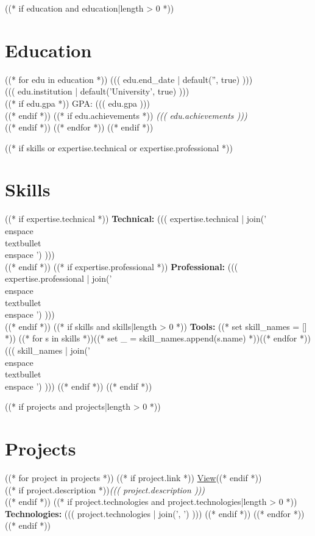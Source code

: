 \documentclass[11pt,a4paper]{article}
\begin{document}
((* if education and education|length > 0 *))
\section{Education}
((* for edu in education *))
 \hfill {\small\color{muted} ((( edu.end_date | default('', true) )))}\\
{\small\color{muted} ((( edu.institution | default('University', true) )))}\\
((* if edu.gpa *))
{\small GPA: ((( edu.gpa )))}\\
((* endif *))
((* if edu.achievements *))
{\small\textit{((( edu.achievements )))}}\\ 
((* endif *))
\vspace{8pt}
((* endfor *))
((* endif *))

((* if skills or expertise.technical or expertise.professional *))
\section{Skills}
((* if expertise.technical *))
{\small\bfseries Technical:} {\small ((( expertise.technical | join(' \\enspace\\textbullet\\enspace ') )))}\\[4pt]
((* endif *))
((* if expertise.professional *))
{\small\bfseries Professional:} {\small ((( expertise.professional | join(' \\enspace\\textbullet\\enspace ') )))}\\[4pt]
((* endif *))
((* if skills and skills|length > 0 *))
{\small\bfseries Tools:}
((* set skill_names = [] *))
((* for s in skills *))((* set _ = skill_names.append(s.name) *))((* endfor *))
{\small ((( skill_names | join(' \\enspace\\textbullet\\enspace ') )))}
((* endif *))
((* endif *))

((* if projects and projects|length > 0 *))
\section{Projects}
((* for project in projects *))
((* if project.link *)) \hfill {\scriptsize\href{((* if 'http' not in project.link *))https://((* endif *))((( project.link )))}{View}}((* endif *))\\
((* if project.description *)){\small\color{muted}\textit{((( project.description )))}}\\((* endif *))
((* if project.technologies and project.technologies|length > 0 *))
{\small\textbf{Technologies:} ((( project.technologies | join(', ') )))}
((* endif *))
\vspace{12pt}
((* endfor *))
((* endif *))
\end{document}
